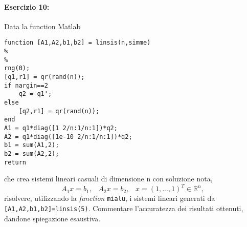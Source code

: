 \documentclass[12pt]{article}
\begin{document}
\paragraph{Esercizio 10:}Data la function Matlab \\
\begin{lstlisting}[frame=single]
function [A1,A2,b1,b2] = linsis(n,simme)
%
%
rng(0);
[q1,r1] = qr(rand(n));
if nargin==2
    q2 = q1'; 
else
    [q2,r1] = qr(rand(n));
end
A1 = q1*diag([1 2/n:1/n:1])*q2;
A2 = q1*diag([1e-10 2/n:1/n:1])*q2;
b1 = sum(A1,2);
b2 = sum(A2,2);
return
\end{lstlisting}
che crea sistemi lineari casuali di dimensione n con soluzione nota,
$$A_1x = b_1,\;\;\; A_2x = b_2, \;\;\;x = (1,...,1)^T \in \mathbb{R}^n,$$
risolvere, utilizzando la \textit{function} \texttt{mialu}, i sistemi lineari generati da \texttt{[A1,A2,b1,b2]=linsis(5)}. 
Commentare l’accuratezza dei risultati ottenuti, dandone spiegazione esaustiva.
\end{document}
